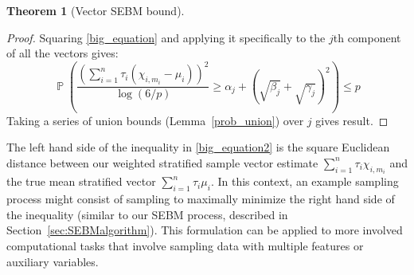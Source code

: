 \documentclass[]{interact}
\DeclareMathOperator{\pr}{\mathbb{P}}
\newlength{\dhatheight}
\newcommand{\doublehat}[1]{%
    \settoheight{\dhatheight}{\ensuremath{\hat{#1}}}%
    \addtolength{\dhatheight}{-0.15ex}%
    \hat{\vphantom{\rule{1pt}{\dhatheight}}%
    \smash{\hat{#1}}}}
\theoremstyle{plain}%
\newtheorem{Theorem}{Theorem}[section]
\theoremstyle{definition}
\theoremstyle{remark}
\begin{document}
\begin{Theorem}[Vector SEBM bound]

\end{Theorem}
\begin{proof}
Squaring \eqref{big_equation} and applying it specifically to the $j$th component of all the vectors gives:
\begin{equation*}
\pr\left(\frac{\left(\sum_{i=1}^n\tau_i(\chi_{i,m_i}-\mu_i)\right)^2}{\log(6/p)} 
\ge \alpha_{j} 
+ \left(\sqrt{\beta_{j}} 
+ \sqrt{\gamma_{j}}\right)^2  \right)
\le p 
\end{equation*}
Taking a series of union bounds (Lemma~\ref{prob_union}) over $j$ gives result.
\end{proof}

The left hand side of the inequality in \eqref{big_equation2} is the square Euclidean distance between our weighted stratified sample vector estimate $\sum_{i=1}^n\tau_i\chi_{i,m_i}$ and the true mean stratified vector $\sum_{i=1}^n\tau_i\mu_{i}$.
In this context, an example sampling process might consist of sampling to maximally minimize the right hand side of the inequality (similar to our SEBM process, described in Section~\ref{sec:SEBMalgorithm}).
This formulation can be applied to more involved computational tasks that involve sampling data with multiple features or auxiliary variables.
\end{document}
